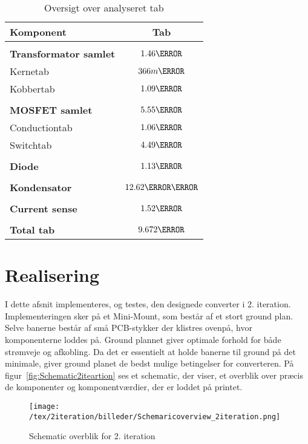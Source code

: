 \begin{table}[H] 			
	\centering
	\begin{tabularx}{\textwidth}{|X|c|}
		\hline
		\textbf{\large Komponent} & {\textbf{\large Tab}} \\ \hline
		& 	\\ \hline
		\textbf{Transformator samlet} & $1.46\watt$ \\ \hline 
		Kernetab & $366m\watt$ \\ \hline
		Kobbertab & $1.09\watt$ \\ \hline
		& 	\\ \hline
		\textbf{MOSFET samlet} & $5.55\watt$ \\ \hline
		Conductiontab & $1.06\watt$ \\ \hline
		Switchtab & $4.49\watt$ \\ \hline
		& 	\\ \hline
		\textbf{Diode} & $1.13\watt$ \\ \hline
		& 	\\ \hline
		\textbf{Kondensator} & $12.62\milli\watt$ \\ \hline
		& 	\\ \hline
			\textbf{Current sense} & $1.52\watt$ \\ \hline
		& 	\\ \hline
		\textbf{Total tab} & $9.672\watt$ \\ \hline
	\end{tabularx}
	\caption{Oversigt over analyseret tab}
	\label{tab:analyseret}
\end{table}



\clearpage 

\section{Realisering}
I dette afsnit implementeres, og testes, den designede converter i 2. iteration. Implementeringen sker på et Mini-Mount, som består af et stort ground plan. Selve banerne består af små PCB-stykker der klistres ovenpå, hvor komponenterne loddes på. Ground plannet giver optimale forhold for både strømveje og afkobling. Da det er essentielt at holde banerne til ground på det minimale, giver ground planet de bedst mulige betingelser for converteren. På figur~\ref{fig:Schematic2iteartion} ses et schematic, der viser, et overblik over præcis de komponenter og komponentværdier, der er loddet på printet.
\begin{figure}[H]
	\center
	\texttt{[image: /tex/2iteration/billeder/Schemaricoverview\_2iteration.png]}
	\caption{Schematic overblik for 2. iteration}
	\label{fig:Schematic2iteration}
\end{figure}

